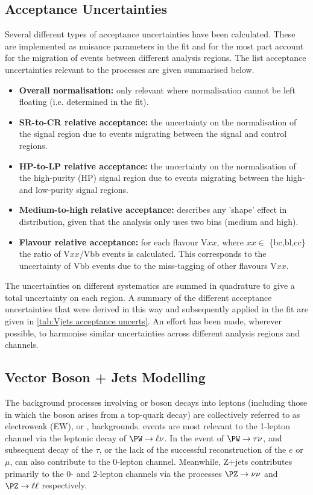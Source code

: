 \subsection{Acceptance Uncertainties}
Several different types of acceptance uncertainties have been calculated. These are implemented as nuisance parameters in the fit and for the most part account for the migration of events between different analysis regions. The list acceptance uncertainties relevant to the \Vjets processes are given summarised below.
%
\begin{itemize}
    \item \textbf{Overall normalisation:} only relevant where normalisation cannot be left floating (i.e. determined in the fit).
    \item \textbf{SR-to-CR relative acceptance:} the uncertainty on the normalisation of the signal region due to events migrating between the signal and control regions.
    \item \textbf{HP-to-LP relative acceptance:} the uncertainty on the normalisation of the high-purity (HP) signal region due to events migrating between the high- and low-purity signal regions.
    \item \textbf{Medium-to-high} \pTV \textbf{relative acceptance:} describes any 'shape' effect in \pTV distribution, given that the analysis only uses two \pTV bins (medium and high).
    \item \textbf{Flavour relative acceptance:} for each flavour V$xx$, where $xx\in$ \{bc,bl,cc\} the ratio of V$xx$/Vbb events is calculated. This corresponds to the uncertainty of Vbb events due to the miss-tagging of other flavours V$xx$. 
\end{itemize}
%
The uncertainties on different systematics are summed in quadrature to give a total uncertainty on each region. A summary of the different acceptance uncertainties that were derived in this way and subsequently applied in the fit are given in \cref{tab:Vjets acceptance uncerts}. An effort has been made, wherever possible, to harmonise similar uncertainties across different analysis regions and channels.


\subsection{Vector Boson + Jets Modelling}
The background processes involving \Wboson or \Zboson boson decays into leptons (including those in which the \Wboson boson arises from a top-quark decay) are collectively referred to as electroweak (EW), or \Vjets, backgrounds.
\Wjets events are most relevant to the 1-lepton channel via the leptonic decay of $\Wboson \rightarrow \ell\nu$.
In the event of $\Wboson \rightarrow \tau\nu$, and subsequent decay of the $\tau$, or the lack of the successful reconstruction of the $e$ or $\mu$, \Wjets can also contribute to the 0-lepton channel.
Meanwhile, Z+jets contributes primarily to the 0- and 2-lepton channels via the processes $\Zboson \rightarrow \nu\nu$ and $\Zboson \rightarrow \ell\ell$ respectively.

